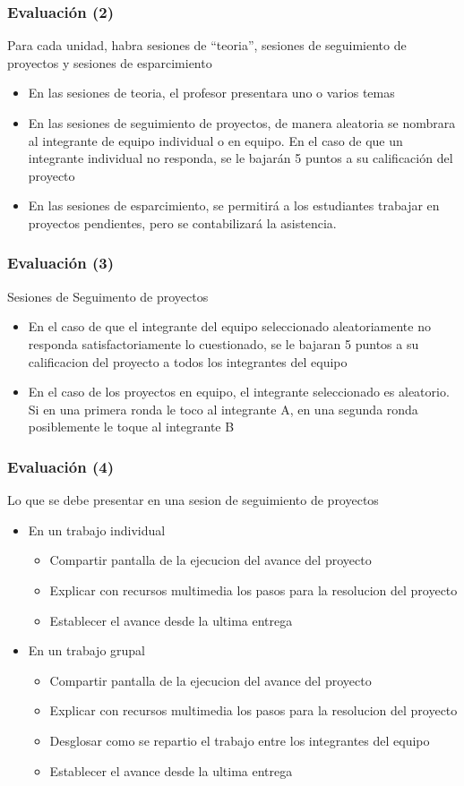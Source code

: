 \documentclass[aspectratio=169]{beamer}
\begin{document}
\begin{frame}
\frametitle{Evaluación (2)}
Para cada unidad, habra sesiones de ``teoria'', sesiones de seguimiento de proyectos y sesiones de esparcimiento
\begin{itemize}
\item En las sesiones de teoria, el profesor presentara uno o varios temas
\item En las sesiones de seguimiento de proyectos, de manera aleatoria se nombrara al integrante de equipo individual o en equipo. En el caso de que un integrante individual no responda, se le bajarán 5 puntos a su calificación del proyecto
\item En las sesiones de esparcimiento, se permitirá a los estudiantes trabajar en proyectos pendientes, pero se contabilizará la asistencia. 
\end{itemize}
\end{frame}

\begin{frame}
\frametitle{Evaluación (3)}
Sesiones de Seguimento de proyectos
\begin{itemize}
\item En el caso de que el integrante del equipo seleccionado aleatoriamente no responda satisfactoriamente lo cuestionado, se le bajaran 5 puntos a su calificacion del proyecto a todos los integrantes del equipo
\item En el caso de los proyectos en equipo, el integrante seleccionado es aleatorio. Si en una primera ronda le toco al integrante A, en una segunda ronda posiblemente le toque al integrante B
\end{itemize}
\end{frame}



\begin{frame}
\frametitle{Evaluación (4)}
Lo que se debe presentar en una sesion de seguimiento de proyectos
\begin{itemize}
\item En un trabajo individual
\begin{itemize}
\item Compartir pantalla de la ejecucion del avance del proyecto
\item Explicar con recursos multimedia los pasos para la resolucion del proyecto
\item Establecer el avance desde la ultima entrega
\end{itemize}
\item En un trabajo grupal
\begin{itemize}
\item Compartir pantalla de la ejecucion del avance del proyecto
\item Explicar con recursos multimedia los pasos para la resolucion del proyecto
\item Desglosar como se repartio el trabajo entre los integrantes del equipo
\item Establecer el avance desde la ultima entrega
\end{itemize}
\end{itemize}
\end{frame}
\end{document}
